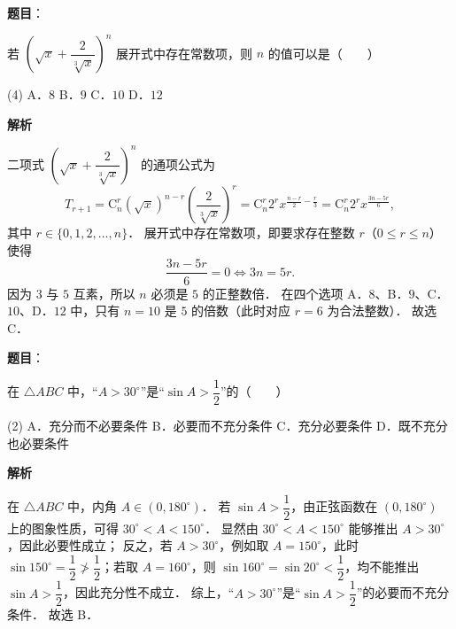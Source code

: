 \begin{answer}

\textbf{题目}：

若 $\left(\sqrt{x} + \dfrac{2}{\sqrt[3]{x}}\right)^n$ 展开式中存在常数项，则 $n$ 的值可以是\mbox{（　　）}

\begin{gkopts}(4)
\task A．$8$
\task B．$9$
\task C．$10$
\task D．$12$
\end{gkopts}

\textbf{解析}

二项式 $\left(\sqrt{x} + \dfrac{2}{\sqrt[3]{x}}\right)^n$ 的通项公式为
\nopagebreak[4]
\[
T_{r+1} = \mathrm{C}_n^r (\sqrt{x})^{n-r} \left(\frac{2}{\sqrt[3]{x}}\right)^r = \mathrm{C}_n^r 2^r x^{\frac{n-r}{2} - \frac{r}{3}} = \mathrm{C}_n^r 2^r x^{\frac{3n - 5r}{6}},
\]
其中 $r \in \{0, 1, 2, \dots, n\}$．
展开式中存在常数项，即要求存在整数 $r$（$0 \leqslant r \leqslant n$）使得
\nopagebreak[4]
\[
\frac{3n - 5r}{6} = 0 \iff 3n = 5r.
\]
因为 $3$ 与 $5$ 互素，所以 $n$ 必须是 $5$ 的正整数倍．
在四个选项 A．$8$、B．$9$、C．$10$、D．$12$ 中，只有 $n = 10$ 是 $5$ 的倍数（此时对应 $r = 6$ 为合法整数）．
故选 C．


\end{answer}
\begin{answer}

\textbf{题目}：

在 $\triangle ABC$ 中，“$A > 30^\circ$”是“$\sin A > \dfrac{1}{2}$”的\mbox{（　　）}

\begin{gkopts}(2)
\task A．充分而不必要条件
\task B．必要而不充分条件
\task C．充分必要条件
\task D．既不充分也必要条件
\end{gkopts}

\textbf{解析}

在 $\triangle ABC$ 中，内角 $A \in (0, 180^\circ)$．
若 $\sin A > \dfrac{1}{2}$，由正弦函数在 $(0, 180^\circ)$ 上的图象性质，可得 $30^\circ < A < 150^\circ$．
显然由 $30^\circ < A < 150^\circ$ 能够推出 $A > 30^\circ$，因此必要性成立；
反之，若 $A > 30^\circ$，例如取 $A = 150^\circ$，此时 $\sin 150^\circ = \dfrac{1}{2} \not> \dfrac{1}{2}$；若取 $A = 160^\circ$，则 $\sin 160^\circ = \sin 20^\circ < \dfrac{1}{2}$，均不能推出 $\sin A > \dfrac{1}{2}$，因此充分性不成立．
综上，“$A > 30^\circ$”是“$\sin A > \dfrac{1}{2}$”的必要而不充分条件．
故选 B．


\end{answer}
